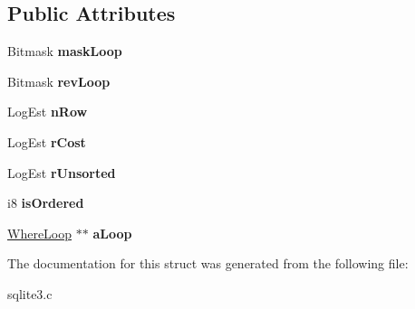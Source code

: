 \subsection*{Public Attributes}
\begin{DoxyCompactItemize}
\item 
Bitmask {\bfseries mask\+Loop}\hypertarget{structWherePath_a4a0a59d31e51c3a8f9fdfdbfb384ab73}{}\label{structWherePath_a4a0a59d31e51c3a8f9fdfdbfb384ab73}

\item 
Bitmask {\bfseries rev\+Loop}\hypertarget{structWherePath_a6f6bf0a804430fb08f4aadc506f5cc14}{}\label{structWherePath_a6f6bf0a804430fb08f4aadc506f5cc14}

\item 
Log\+Est {\bfseries n\+Row}\hypertarget{structWherePath_ab9e893b128d34fc8bc832de593387c99}{}\label{structWherePath_ab9e893b128d34fc8bc832de593387c99}

\item 
Log\+Est {\bfseries r\+Cost}\hypertarget{structWherePath_a8ca2a9ddc42527170167eb6f08d85878}{}\label{structWherePath_a8ca2a9ddc42527170167eb6f08d85878}

\item 
Log\+Est {\bfseries r\+Unsorted}\hypertarget{structWherePath_a69b10c1c4a8e00814f80144dad12c4ad}{}\label{structWherePath_a69b10c1c4a8e00814f80144dad12c4ad}

\item 
i8 {\bfseries is\+Ordered}\hypertarget{structWherePath_a2793b5b50bc1ec2cf8f9c6e5744c2826}{}\label{structWherePath_a2793b5b50bc1ec2cf8f9c6e5744c2826}

\item 
\hyperlink{structWhereLoop}{Where\+Loop} $\ast$$\ast$ {\bfseries a\+Loop}\hypertarget{structWherePath_a63e12088b414ce0b0b1ee43655733dd1}{}\label{structWherePath_a63e12088b414ce0b0b1ee43655733dd1}

\end{DoxyCompactItemize}


The documentation for this struct was generated from the following file\+:\begin{DoxyCompactItemize}
\item 
sqlite3.\+c\end{DoxyCompactItemize}
